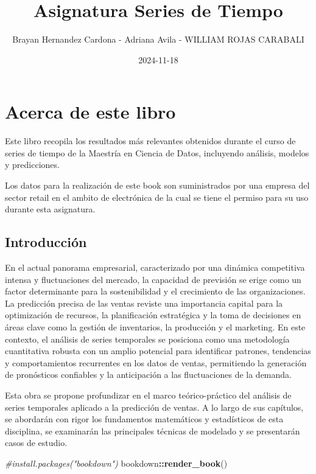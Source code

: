 \documentclass[
]{book}
\title{Asignatura Series de Tiempo}
\author{Brayan Hernandez Cardona - Adriana Avila - WILLIAM ROJAS CARABALI}
\date{2024-11-18}
\newenvironment{Shaded}{\begin{snugshade}}{\end{snugshade}}
\newcommand{\CommentTok}[1]{\textcolor[rgb]{0.56,0.35,0.01}{\textit{#1}}}
\newcommand{\FunctionTok}[1]{\textcolor[rgb]{0.13,0.29,0.53}{\textbf{#1}}}
\newcommand{\NormalTok}[1]{#1}
\newcommand{\SpecialCharTok}[1]{\textcolor[rgb]{0.81,0.36,0.00}{\textbf{#1}}}
\begin{document}
\maketitle

{
\setcounter{tocdepth}{1}
\tableofcontents
}
\chapter{Acerca de este libro}\label{acerca-de-este-libro}

Este libro recopila los resultados más relevantes obtenidos durante el curso de series de tiempo de la Maestría en Ciencia de Datos, incluyendo análisis, modelos y predicciones.

Los datos para la realización de este book son suministrados por una empresa del sector retail en el ambito de electrónica de la cual se tiene el permiso para su uso durante esta asignatura.

\section{Introducción}\label{introducciuxf3n}

En el actual panorama empresarial, caracterizado por una dinámica competitiva intensa y fluctuaciones del mercado, la capacidad de previsión se erige como un factor determinante para la sostenibilidad y el crecimiento de las organizaciones. La predicción precisa de las ventas reviste una importancia capital para la optimización de recursos, la planificación estratégica y la toma de decisiones en áreas clave como la gestión de inventarios, la producción y el marketing. En este contexto, el análisis de series temporales se posiciona como una metodología cuantitativa robusta con un amplio potencial para identificar patrones, tendencias y comportamientos recurrentes en los datos de ventas, permitiendo la generación de pronósticos confiables y la anticipación a las fluctuaciones de la demanda.

Esta obra se propone profundizar en el marco teórico-práctico del análisis de series temporales aplicado a la predicción de ventas. A lo largo de sus capítulos, se abordarán con rigor los fundamentos matemáticos y estadísticos de esta disciplina, se examinarán las principales técnicas de modelado y se presentarán casos de estudio.

\begin{Shaded}
\begin{Highlighting}[]
\CommentTok{\#install.packages("bookdown")}
\NormalTok{bookdown}\SpecialCharTok{::}\FunctionTok{render\_book}\NormalTok{()}
\end{Highlighting}
\end{Shaded}
\end{document}
